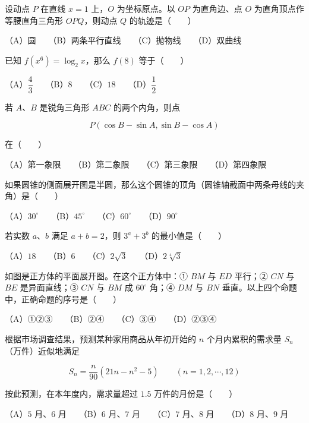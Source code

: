\begin{question}
设动点 $P$ 在直线 $x=1$ 上，$O$ 为坐标原点。以 $OP$ 为直角边、点 $O$ 为直角顶点作等腰直角三角形 $OPQ$，则动点 $Q$ 的轨迹是\mbox{（　　）}

（A）圆　　（B）两条平行直线　　（C）抛物线　　（D）双曲线

\end{question}
\begin{question}
已知 $f(x^6)=\log_2x$，那么 $f(8)$ 等于\mbox{（　　）}

（A）$\dfrac43$　　（B）$8$　　（C）$18$　　（D）$\dfrac12$

\end{question}
\begin{question}
若 $A\text{、}B$ 是锐角三角形 $ABC$ 的两个内角，则点

\nopagebreak[4]
\[
P(\cos B-\sin A,\sin B-\cos A)
\]

在\mbox{（　　）}

（A）第一象限　　（B）第二象限　　（C）第三象限　　（D）第四象限

\end{question}
\begin{question}
如果圆锥的侧面展开图是半圆，那么这个圆锥的顶角（圆锥轴截面中两条母线的夹角）是\mbox{（　　）}

（A）$30^\circ$　　（B）$45^\circ$　　（C）$60^\circ$　　（D）$90^\circ$

\end{question}
\begin{question}
若实数 $a\text{、}b$ 满足 $a+b=2$，则 $3^a+3^b$ 的最小值是\mbox{（　　）}

（A）$18$　　（B）$6$　　（C）$2\sqrt3$　　（D）$2\sqrt[4]{3}$

\Needspace{0.4\textheight}
\end{question}
\begin{question}
如图是正方体的平面展开图。在这个正方体中：① $BM$ 与 $ED$ 平行；② $CN$ 与 $BE$ 是异面直线；③ $CN$ 与 $BM$ 成 $60^\circ$ 角；④ $DM$ 与 $BN$ 垂直。以上四个命题中，正确命题的序号是\mbox{（　　）}
\nopagebreak[4]
\begin{center}\end{center}
\nopagebreak[4]
（A）①②③　　（B）②④　　（C）③④　　（D）②③④

\end{question}
\begin{question}
根据市场调查结果，预测某种家用商品从年初开始的 $n$ 个月内累积的需求量 $S_n$（万件）近似地满足

\nopagebreak[4]
\[
S_n=\frac n{90}(21n-n^2-5)\qquad(n=1,2,\cdots,12)
\]

按此预测，在本年度内，需求量超过 $1.5$ 万件的月份是\mbox{（　　）}

（A）$5$ 月、$6$ 月　　（B）$6$ 月、$7$ 月　　（C）$7$ 月、$8$ 月　　（D）$8$ 月、$9$ 月

\end{question}


